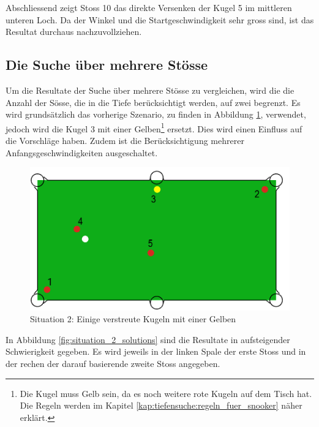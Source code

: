 Abschliessend zeigt Stoss 10 das direkte Versenken der Kugel 5 im mittleren unteren Loch.
Da der Winkel und die Startgeschwindigkeit sehr gross sind, ist das Resultat durchaus nachzuvollziehen.

\newpage
\subsection{Die Suche über mehrere Stösse}
Um die Resultate der Suche über mehrere Stösse zu vergleichen, wird die die Anzahl der Sösse, die in die Tiefe
berücksichtigt werden, auf zwei begrenzt. Es wird grundsätzlich das vorherige Szenario, zu finden in Abbildung
\ref{fig:search_situation_2}, verwendet, jedoch wird die
Kugel 3 mit einer Gelben\footnote{Die Kugel muss Gelb sein, da es noch weitere rote Kugeln auf dem Tisch hat. Die
Regeln werden im Kapitel \ref{kap:tiefensuche:regeln_fuer_snooker} näher erklärt.} ersetzt. Dies wird
einen Einfluss auf die Vorschläge haben. Zudem ist die Berücksichtigung mehrerer Anfangsgeschwindigkeiten ausgeschaltet.

%
%
\begin{figure}[h!]
    \begin{center}
        \includegraphics[width=0.4\linewidth]{../common/04_results/resources/simple_search/situation_diverse_deep_search.PNG}
    \end{center}
    \caption{Situation 2: Einige verstreute Kugeln mit einer Gelben}
    \label{fig:search_situation_2}
\end{figure}

In Abbildung \ref{fig:situation_2_solutions} sind die Resultate in aufsteigender Schwierigkeit gegeben. Es wird
jeweils in der linken Spale der erste Stoss und in der rechen der darauf basierende zweite Stoss angegeben.

